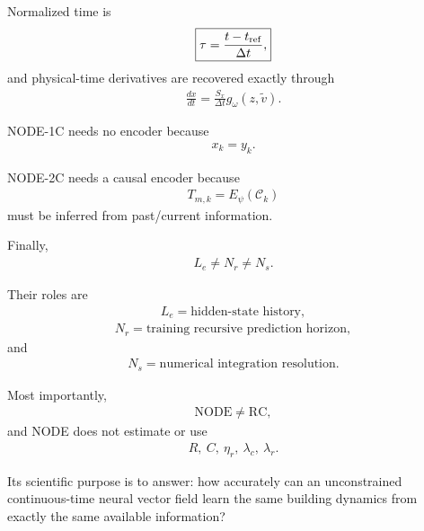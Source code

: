 \documentclass[11pt]{article}
\begin{document}
Normalized time is
\begin{align}
\boxed{
\tau=\frac{t-t_{\rm ref}}{\Delta t},
}
\end{align}
and physical-time derivatives are recovered exactly through
\begin{align}
\boxed{
\frac{dx}{dt}
=
\frac{S_x}{\Delta t}g_\omega(z,\widetilde v).
}
\end{align}

NODE-1C needs no encoder because
\begin{align}
\boxed{x_k=y_k.}
\end{align}

NODE-2C needs a causal encoder because
\begin{align}
\boxed{
T_{m,k}=E_\psi(\mathcal C_k)
}
\end{align}
must be inferred from past/current information.

Finally,
\begin{align}
\boxed{L_e\neq N_r\neq N_s.}
\end{align}

Their roles are
\begin{align}
\boxed{L_e=\text{hidden-state history},}
\end{align}
\begin{align}
\boxed{N_r=\text{training recursive prediction horizon},}
\end{align}
and
\begin{align}
\boxed{N_s=\text{numerical integration resolution}.}
\end{align}

Most importantly,
\begin{align}
\boxed{\mathrm{NODE}\neq\mathrm{RC},}
\end{align}
and NODE does not estimate or use
\begin{align}
R,\ C,\ \eta_r,\ \lambda_c,\ \lambda_r.
\end{align}

Its scientific purpose is to answer: how accurately can an unconstrained continuous-time neural vector field learn the same building dynamics from exactly the same available information?
\end{document}
